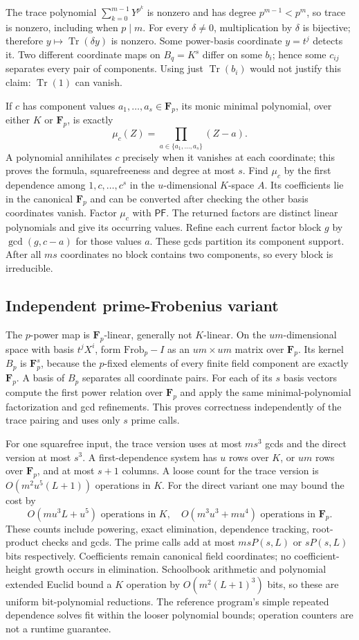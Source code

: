 \documentclass[11pt]{article}
\newcommand{\Fp}{\mathbf F_p}
\newcommand{\Tr}{\operatorname{Tr}}
\newcommand{\PF}{\mathsf{PF}}
\begin{document}
The trace polynomial $\sum_{k=0}^{m-1}Y^{p^k}$ is nonzero and has degree
$p^{m-1}<p^m$, so trace is nonzero, including when $p\mid m$.
For every $\delta\ne0$, multiplication by $\delta$ is bijective;
therefore $y\mapsto\Tr(\delta y)$ is nonzero. Some power-basis coordinate
$y=t^j$ detects it. Two different coordinate maps on $B_q=K^s$ differ
on some $b_i$; hence some $c_{ij}$ separates every pair of components.
Using just $\Tr(b_i)$ would not justify this claim: $\Tr(1)$ can vanish.

If $c$ has component values $a_1,\ldots,a_s\in\Fp$, its monic minimal
polynomial, over either $K$ or $\Fp$, is exactly
\[
 \mu_c(Z)=\prod_{a\in\{a_1,\ldots,a_s\}}(Z-a).
\]
A polynomial annihilates $c$ precisely when it vanishes at each coordinate;
this proves the formula, squarefreeness and degree at most $s$.
Find $\mu_c$ by the first dependence among $1,c,\ldots,c^s$ in the
$u$-dimensional $K$-space $A$. Its coefficients lie in the canonical
$\Fp$ and can be converted after checking the other basis coordinates vanish.
Factor $\mu_c$ with $\PF$. The returned factors are distinct linear
polynomials and give its occurring values. Refine each current factor block
$g$ by $\gcd(g,c-a)$ for those values $a$. These gcds partition its
component support. After all $ms$ coordinates no block contains two
components, so every block is irreducible.

\subsection{Independent prime-Frobenius variant}
The $p$-power map is $\Fp$-linear, generally not $K$-linear.
On the $um$-dimensional space with basis $t^jX^i$, form
$\mathrm{Frob}_p-I$ as an $um\times um$ matrix over $\Fp$.
Its kernel $B_p$ is $\Fp^s$, because the $p$-fixed elements of every
finite field component are exactly $\Fp$. A basis of $B_p$ separates
all coordinate pairs. For each of its $s$ basis vectors compute the
first power relation over $\Fp$ and apply the same minimal-polynomial
factorization and gcd refinements. This proves correctness independently
of the trace pairing and uses only $s$ prime calls.

For one squarefree input, the trace version uses at most $ms^3$ gcds
and the direct version at most $s^3$. A first-dependence system has
$u$ rows over $K$, or $um$ rows over $\Fp$, and at most $s+1$ columns.
A loose count for the trace version is $O(m^2u^5(L+1))$ operations in $K$.
For the direct variant one may bound the cost by
\[
 O(mu^3L+u^5)\text{ operations in }K,
 \quad O(m^3u^3+mu^4)\text{ operations in }\Fp.
\]
These counts include powering, exact elimination, dependence tracking,
root-product checks and gcds. The prime calls add at most $msP(s,L)$
or $sP(s,L)$ bits respectively. Coefficients remain canonical field
coordinates; no coefficient-height growth occurs in elimination.
Schoolbook arithmetic and polynomial extended Euclid bound a $K$ operation
by $O(m^2(L+1)^3)$ bits, so these are uniform bit-polynomial reductions.
The reference program's simple repeated dependence solves fit within the
looser polynomial bounds; operation counters are not a runtime guarantee.
\end{document}

